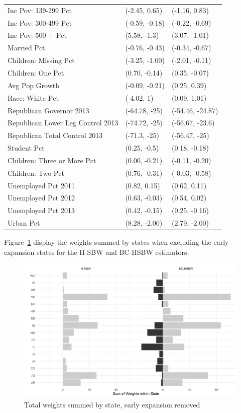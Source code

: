 \begin{table}[ht]
\begin{tabular}{lll}
  Inc Pov: 139-299 Pct & (-2.45, 0.65) & (-1.16, 0.83) \\ 
  Inc Pov: 300-499 Pct & (-0.59, -0.18) & (-0.22, -0.69) \\ 
  Inc Pov: 500 + Pct & (5.58, -1.3) & (3.07, -1.01) \\ 
  Married Pct & (-0.76, -0.43) & (-0.34, -0.67) \\ 
  Children: Missing Pct & (-3.25, -1.00) & (-2.01, -0.11) \\ 
  Children: One Pct & (0.70, -0.14) & (0.35, -0.07) \\ 
  Avg Pop Growth & (-0.09, -0.21) & (0.25, 0.39) \\ 
  Race: White Pct & (-4.02, 1) & (0.09, 1.01) \\ 
  Republican Governor 2013 & (-64.78, -25) & (-54.46, -24.87) \\ 
  Republican Lower Leg Control 2013 & (-74.72, -25) & (-56.67, -23.6) \\ 
  Republican Total Control 2013 & (-71.3, -25) & (-56.47, -25) \\ 
  Student Pct & (0.25, -0.5) & (0.18, -0.18) \\ 
  Children: Three or More Pct & (0.00, -0.21) & (-0.11, -0.20) \\ 
  Children: Two Pct & (0.76, -0.31) & (-0.03, -0.58) \\ 
  Unemployed Pct 2011 & (0.82, 0.15) & (0.62, 0.11) \\ 
  Unemployed Pct 2012 & (0.63, -0.03) & (0.54, 0.02) \\ 
  Unemployed Pct 2013 & (0.42, -0.15) & (0.25, -0.16) \\ 
  Urban Pct & (8.28, -2.00) & (2.79, -2.00) \\ 
   \hline
\end{tabular}
\end{table}

Figure~\ref{fig:weightsbystatec2} display the weights summed by states when excluding the early expansion states for the H-SBW and BC-HSBW estimators.

\begin{figure}[H]
\begin{center}
    \caption{Total weights summed by state, early expansion removed}
    \label{fig:weightsbystatec2}
    \includegraphics[scale=0.5]{01_Plots/weights-by-state-hsbw-c2.png}
\end{center}
\end{figure}
